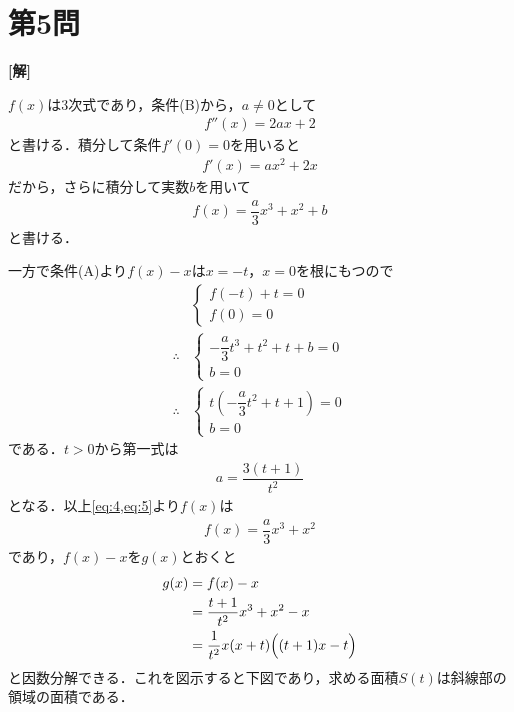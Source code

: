 \documentclass[../main.tex]{subfiles}
\begin{document}
\newpage
\section*{第5問}

{\bf [解]}

$f(x)$は3次式であり，条件(B)から，$a\neq0$として
\begin{align}
  f''(x)=2ax+2 \label{eq:1}
\end{align}
と書ける．積分して条件$f'(0)=0$を用いると
\begin{align}
  f'(x)=ax^2+2x \label{eq:2}
\end{align}
だから，さらに積分して実数$b$を用いて
\begin{align}
  f(x)=\dfrac{a}{3}x^3+x^2+b \label{eq:3}
\end{align}
と書ける．

一方で条件(A)より$f(x)-x$は$x=-t$，$x=0$を根にもつので
\begin{align}
  &
  \begin{cases}
    f(-t)+t = 0 \\
    f(0) = 0
  \end{cases} \\
  \therefore
  &
  \begin{cases}
    -\dfrac{a}{3}t^3+t^2+t+b=0 \\
    b=0
  \end{cases} \\
  \therefore
  &
  \begin{cases}
    t\left(-\dfrac{a}{3}t^2+t+1\right) = 0 \\
    b=0
  \end{cases} \label{eq:4}
\end{align}
である．$t>0$から第一式は
\begin{align}
  a=\dfrac{3(t+1)}{t^2} \label{eq:5}
\end{align}
となる．以上\cref{eq:4,eq:5}より$f(x)$は
\begin{align}
  f(x) = \dfrac{a}{3}x^3+x^2 \label{eq:6}
\end{align}
であり，$f(x)-x$を$g(x)$とおくと
\begin{align}
  g(x)
  &=f(x)-x \\
  &=\dfrac{t+1}{t^2}x^3+x^2-x\\
  &=\dfrac{1}{t^2}x(x+t)\Bigl((t+1)x-t\Bigr)
\end{align}
と因数分解できる．これを図示すると下図であり，求める面積$S(t)$は斜線部の領域の面積である．
\end{document}
